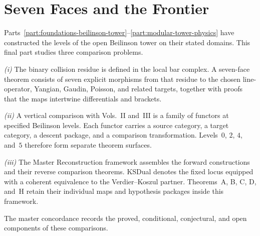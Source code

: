 \documentclass[11pt]{memoir}
\begin{document}

\part{Seven Faces and the Frontier}
\label{part:seven-faces}

\noindent
Parts~\ref{part:foundations-beilinson-tower}--\ref{part:modular-tower-physics}
have constructed the levels of the open Beilinson tower on their
stated domains.  This final part studies three comparison problems.

\textit{(i)} The binary collision residue is defined in the local bar
complex.  A seven-face theorem consists of seven explicit morphisms
from that residue to the chosen line-operator, Yangian, Gaudin,
Poisson, and related targets, together with proofs that the maps
intertwine differentials and brackets.

\textit{(ii)} A vertical comparison with Vols.~II and~III is a family
of functors at specified Beilinson levels.  Each functor carries a
source category, a target category, a descent package, and a
comparison transformation.  Levels~$0$, $2$, $4$, and~$5$ therefore
form separate theorem surfaces.

\textit{(iii)} The Master Reconstruction framework assembles the
forward constructions and their reverse comparison theorems.
KSDual denotes the fixed locus equipped with a coherent equivalence
to the Verdier--Koszul partner.  Theorems~A, B, C, D, and~H retain
their individual maps and hypothesis packages inside this framework.

The master concordance records the proved, conditional, conjectural,
and open components of these comparisons.




\end{document}
